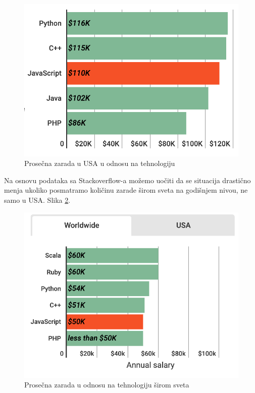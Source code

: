 \documentclass[a4paper]{article}
\begin{document}
\begin{figure}[h!]
\begin{center}
\includegraphics[scale=0.6]{slike/salary1.png}
\end{center}
\caption{Prosečna zarada u USA u odnosu na tehnologiju}
\label{fig:salary1}
\end{figure}

Na osnovu podataka sa Stackoverflow-a možemo uočiti da se situacija drastično menja ukoliko posmatramo količinu zarade širom sveta na godišnjem nivou, ne samo u USA. Slika \ref{fig:salary3}. 

\begin{figure}[h!]
\begin{center}
\includegraphics[scale=0.6]{slike/salary3.png}
\end{center}
\caption{Prosečna zarada u odnosu na tehnologiju širom sveta}
\label{fig:salary3}
\end{figure}
\end{document}
